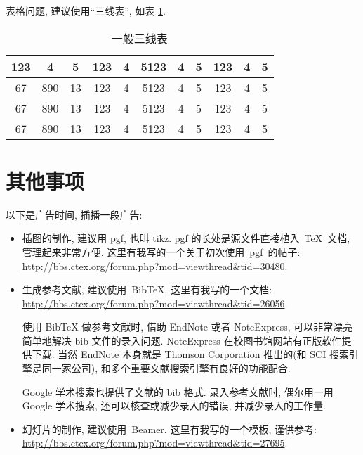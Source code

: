 \documentclass[forprint]{WHUBachelor}
\begin{document}
表格问题, 建议使用``三线表'', 如表 \ref{tab:1}.

\begin{table}[ht]
\centering
\caption{一般三线表}
\label{tab:1}
    \begin{tabular}{c c c c c c c c c c c}
    \hline
    123 & 4  & 5  & 123 & 4 & 5123 & 4 & 5 & 123 & 4 & 5\\
    \hline
    67 & 890 & 13 & 123 & 4 & 5123 & 4 & 5 & 123 & 4 & 5\\
    67 & 890 & 13 & 123 & 4 & 5123 & 4 & 5 & 123 & 4 & 5\\
    67 & 890 & 13 & 123 & 4 & 5123 & 4 & 5 & 123 & 4 & 5\\
    \hline
    \end{tabular}
\end{table}







\chapter{其他事项}
以下是广告时间, 插播一段广告:
\begin{itemize}
    \item 插图的制作, 建议用 pgf, 也叫 tikz.
          pgf 的长处是源文件直接植入~\TeX~文档, 管理起来非常方便.
    这里有我写的一个关于初次使用~pgf~的帖子:\\    \url{http://bbs.ctex.org/forum.php?mod=viewthread&tid=30480}.
    \item 生成参考文献, 建议使用~BibTeX. 这里有我写的一个文档: \\
    \url{http://bbs.ctex.org/forum.php?mod=viewthread&tid=26056}.

          {\kaishu 使用 BibTeX{} 做参考文献时,
      借助 EndNote 或者 NoteExpress, 可以非常漂亮简单地解决 bib 文件的录入问题.
      NoteExpress 在校图书馆网站有正版软件提供下载.
      当然 EndNote 本身就是 Thomson Corporation 推出的(和 SCI 搜索引擎是同一家公司),
      和多个重要文献搜索引擎有良好的功能配合.

      Google 学术搜索也提供了文献的 bib 格式.
      录入参考文献时, 偶尔用一用 Google 学术搜索, 还可以核查或减少录入的错误, 并减少录入的工作量.}

    \item 幻灯片的制作, 建议使用~Beamer. 这里有我写的一个模板, 谨供参考:\\
    \url{http://bbs.ctex.org/forum.php?mod=viewthread&tid=27695}.
\end{itemize}
\end{document}
